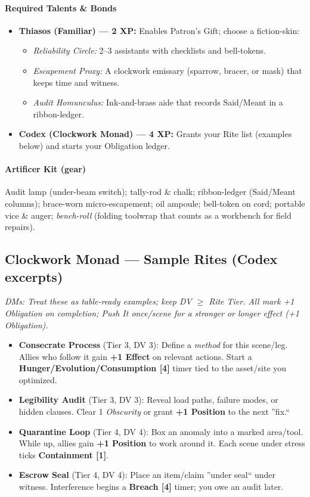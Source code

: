 \documentclass[11pt]{article}
\begin{document}
\paragraph{Required Talents \& Bonds}
\begin{itemize}[leftmargin=*]
  \item \textbf{Thiasos (Familiar) --- 2 XP:} Enables Patron's Gift; choose a fiction-skin:
    \begin{itemize}
      \item \emph{Reliability Circle:} 2--3 assistants with checklists and bell-tokens.
      \item \emph{Escapement Proxy:} A clockwork emissary (sparrow, bracer, or mask) that keeps time and witness.
      \item \emph{Audit Homunculus:} Ink-and-brass aide that records Said/Meant in a ribbon-ledger.
    \end{itemize}
  \item \textbf{Codex (Clockwork Monad) --- 4 XP:} Grants your Rite list (examples below) and starts your Obligation ledger.
\end{itemize}

\paragraph{Artificer Kit (gear)}
Audit lamp (under-beam switch); tally-rod \& chalk; ribbon-ledger (Said/Meant columns); brace-worn micro-escapement; oil ampoule; bell-token on cord; portable vice \& auger; \emph{bench-roll} (folding toolwrap that counts as a workbench for field repairs).

\subsection*{Clockwork Monad --- Sample Rites (Codex excerpts)}
\textit{DMs: Treat these as table-ready examples; keep DV $\geq$ Rite Tier. All mark +1 Obligation on completion; \emph{Push It} once/scene for a stronger or longer effect (+1 Obligation).}
\begin{itemize}[leftmargin=*]
  \item \textbf{Consecrate Process} (Tier 3, DV 3): Define a \emph{method} for this scene/leg. Allies who follow it gain \textbf{+1 Effect} on relevant actions. Start a \textbf{Hunger/Evolution/Consumption [4]} timer tied to the asset/site you optimized.
  \item \textbf{Legibility Audit} (Tier 3, DV 3): Reveal load paths, failure modes, or hidden clauses. Clear 1 \emph{Obscurity} or grant \textbf{+1 Position} to the next ''fix.``
  \item \quad \textbf{Quarantine Loop} (Tier 4, DV 4): Box an anomaly into a marked area/tool. While up, allies gain \textbf{+1 Position} to work around it. Each scene under stress ticks \textbf{Containment [1]}.
  \item \textbf{Escrow Seal} (Tier 4, DV 4): Place an item/claim ''under seal`` under witness. Interference begins a \textbf{Breach [4]} timer; you owe an audit later.
\end{itemize}
\end{document}
